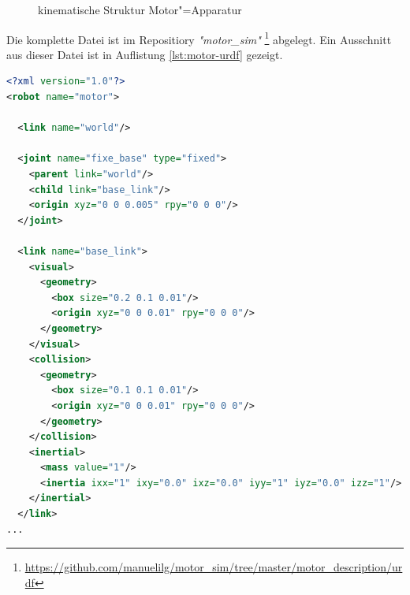 \begin{figure}[ht!]
	\centering
{}
	\caption{kinematische Struktur Motor"=Apparatur}
	\label{Ab:motor-struktur}
\end{figure}

Die komplette Datei ist im Repositiory \textit{\textsc{"}motor\_sim\textit{"}} \footnote{\url{https://github.com/manuelilg/motor_sim/tree/master/motor_description/urdf}} abgelegt.
Ein Ausschnitt aus dieser Datei ist in Auflistung \ref{lst:motor-urdf} gezeigt.

\begin{lstlisting}[language=xml, captionpos=b, caption=Ausschnitt aus motor.urdf, label={lst:motor-urdf}]
<?xml version="1.0"?>
<robot name="motor">

  <link name="world"/>

  <joint name="fixe_base" type="fixed">
    <parent link="world"/>
    <child link="base_link"/>
    <origin xyz="0 0 0.005" rpy="0 0 0"/>
  </joint>

  <link name="base_link">
    <visual>
      <geometry>
        <box size="0.2 0.1 0.01"/>
        <origin xyz="0 0 0.01" rpy="0 0 0"/>
      </geometry>
    </visual>
    <collision>
      <geometry>
        <box size="0.1 0.1 0.01"/>
        <origin xyz="0 0 0.01" rpy="0 0 0"/>
      </geometry>
    </collision>
    <inertial>
      <mass value="1"/>
      <inertia ixx="1" ixy="0.0" ixz="0.0" iyy="1" iyz="0.0" izz="1"/>
    </inertial>
  </link>
...
\end{lstlisting}


